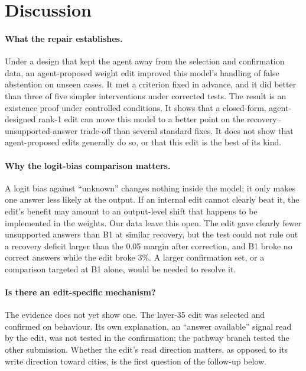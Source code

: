 \section{Discussion}
\label{sec:discussion}

\paragraph{What the repair establishes.}
Under a design that kept the agent away from the selection and confirmation data, an agent-proposed weight edit
improved this model's handling of false abstention on unseen cases. It met a criterion fixed in advance, and it did
better than three of five simpler interventions under corrected tests. The result is an existence proof under
controlled conditions. It shows that a closed-form, agent-designed rank-1 edit can move this model to a better point
on the recovery--unsupported-answer trade-off than several standard fixes. It does not show that agent-proposed edits
generally do so, or that this edit is the best of its kind.

\paragraph{Why the logit-bias comparison matters.}
A logit bias against ``unknown'' changes nothing inside the model; it only makes one answer less likely at the
output. If an internal edit cannot clearly beat it, the edit's benefit may amount to an output-level shift that
happens to be implemented in the weights. Our data leave this open. The edit gave clearly fewer unsupported answers
than B1 at similar recovery, but the test could not rule out a recovery deficit larger than the 0.05 margin after
correction, and B1 broke no correct answers while the edit broke 3\%. A larger confirmation set, or a comparison
targeted at B1 alone, would be needed to resolve it.

\paragraph{Is there an edit-specific mechanism?}
The evidence does not yet show one. The layer-35 edit was selected and confirmed on behaviour. Its own explanation,
an ``answer available'' signal read by the edit, was not tested in the confirmation; the pathway branch tested the
other submission. Whether the edit's read direction matters, as opposed to its write direction toward cities, is the
first question of the follow-up below.

